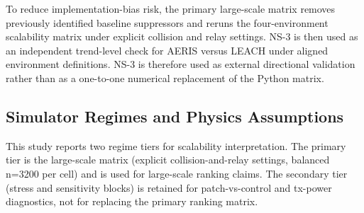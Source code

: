 ﻿\documentclass[sensors,article,submit,moreauthors,pdftex]{Definitions/mdpi}
\begin{document}
To reduce implementation-bias risk, the primary large-scale matrix removes previously identified baseline suppressors and reruns the four-environment scalability matrix under explicit collision and relay settings. NS-3 is then used as an independent trend-level check for AERIS versus LEACH under aligned environment definitions. NS-3 is therefore used as external directional validation rather than as a one-to-one numerical replacement of the Python matrix.

\subsection{Simulator Regimes and Physics Assumptions}
This study reports two regime tiers for scalability interpretation. The primary tier is the large-scale matrix (explicit collision-and-relay settings, balanced n=3200 per cell) and is used for large-scale ranking claims. The secondary tier (stress and sensitivity blocks) is retained for patch-vs-control and tx-power diagnostics, not for replacing the primary ranking matrix.

\begin{table}[H]
\caption{Evidence-regime map used in this manuscript.}
\label{tab:regime_map}
\centering
{}
\end{table}
\end{document}
